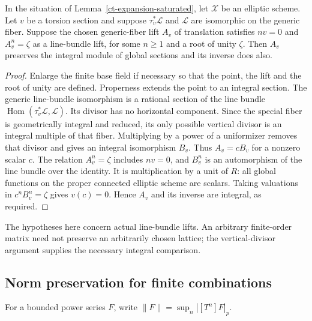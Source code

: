 \begin{lemma}\label{ct-torsion-isometry}
In the situation of Lemma~\ref{ct-expansion-saturated}, let
$\mathscr X$ be an elliptic scheme.  Let $v$ be a torsion section
and suppose $\tau_v^*\mathscr L$ and $\mathscr L$ are isomorphic
on the generic fiber.  Suppose the chosen generic-fiber lift
$A_v$ of translation satisfies $nv=0$ and
$A_v^n=\zeta$ as a line-bundle lift, for some $n\ge1$ and a
root of unity $\zeta$.
Then $A_v$ preserves the integral module of global sections and
its inverse does also.
\end{lemma}
\begin{proof}
Enlarge the finite base field if necessary so that the point,
the lift and the root of unity are defined.  Properness extends
the point to an integral section.  The generic line-bundle
isomorphism is a rational section of the line bundle
$\operatorname{Hom}(\tau_v^*\mathscr L,\mathscr L)$.
Its divisor has no horizontal component.  Since the special
fiber is geometrically integral and reduced, its only possible
vertical divisor is an integral multiple of that fiber.
Multiplying by a power of a uniformizer removes that divisor
and gives an integral isomorphism $B_v$.
Thus $A_v=cB_v$ for a nonzero scalar $c$.
The relation $A_v^n=\zeta$ includes $nv=0$, and
$B_v^n$ is an automorphism of the line bundle over the identity.
It is multiplication by a unit of $R$: all global functions on
the proper connected elliptic scheme are scalars.
Taking valuations in $c^nB_v^n=\zeta$ gives $v(c)=0$.
Hence $A_v$ and its inverse are integral, as required.
\end{proof}

The hypotheses here concern actual line-bundle lifts.  An arbitrary
finite-order matrix need not preserve an arbitrarily chosen
lattice; the vertical-divisor argument supplies the necessary
integral comparison.

\subsection{Norm preservation for finite combinations}

For a bounded power series $F$, write
$\|F\|=\sup_n|[T^n]F|_p$.

